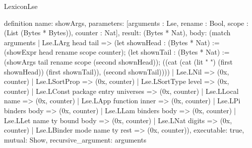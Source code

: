 \begin{lexlean}{LexiconLse}
\begin{semanticmodule}
definition{
  name: showArgs,
  parameters: [arguments : Lse, rename : Bool, scope : (List (Bytes * Bytes)), counter : Nat],
  result: (Bytes * Nat),
  body: (match arguments
    | Lse.LArg head tail => (let shownHead : (Bytes * Nat) := (showExpr head rename scope counter); (let shownTail : (Bytes * Nat) := (showArgs tail rename scope (second shownHead)); ((cat (cat (lit " ") (first shownHead)) (first shownTail)), (second shownTail))))
    | Lse.LNil => (0x, counter)
    | Lse.LSortProp => (0x, counter)
    | Lse.LSortType level => (0x, counter)
    | Lse.LConst package entry universes => (0x, counter)
    | Lse.LLocal name => (0x, counter)
    | Lse.LApp function inner => (0x, counter)
    | Lse.LPi binders body => (0x, counter)
    | Lse.LLam binders body => (0x, counter)
    | Lse.LLet name ty bound body => (0x, counter)
    | Lse.LNat digits => (0x, counter)
    | Lse.LBinder mode name ty rest => (0x, counter)),
  executable: true,
  mutual: Show,
  recursive_argument: arguments
}


\end{semanticmodule}
\end{lexlean}
